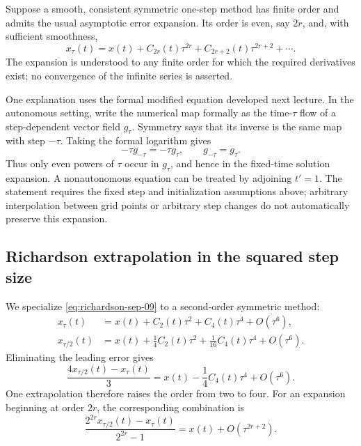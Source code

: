 \begin{theorem}
 Suppose a smooth, consistent symmetric one-step method has finite
 order and admits the usual asymptotic error expansion. Its order
 is even, say \(2r\), and, with sufficient smoothness,
 \begin{equation}\label{eq:even-error-sep-30}
  x_\tau(t)=x(t)+C_{2r}(t)\tau^{2r}
       +C_{2r+2}(t)\tau^{2r+2}+\cdots.
 \end{equation}
 The expansion is understood to any finite order for which the
 required derivatives exist; no convergence of the infinite series
 is asserted.
\end{theorem}

One explanation uses the formal modified equation developed next
lecture. In the autonomous setting, write the numerical map formally
as the time-\(\tau\) flow of a step-dependent vector field
\(g_\tau\). Symmetry says that its inverse is the same map with
step \(-\tau\). Taking the formal logarithm gives
\[
 -\tau g_{-\tau}=-\tau g_\tau,
 \qquad g_{-\tau}=g_\tau.
\]
Thus only even powers of \(\tau\) occur in \(g_\tau\), and hence
in the fixed-time solution expansion. A nonautonomous equation can
be treated by adjoining \(t'=1\). The statement requires the fixed
step and initialization assumptions above; arbitrary interpolation
between grid points or arbitrary step changes do not automatically
preserve this expansion.

\subsection{Richardson extrapolation in the squared step size}

We specialize \eqref{eq:richardson-sep-09} to a second-order
symmetric method:
\begin{align*}
 x_\tau(t)&=x(t)+C_2(t)\tau^2+C_4(t)\tau^4+O(\tau^6),\\
 x_{\tau/2}(t)&=x(t)+\frac14C_2(t)\tau^2
                          +\frac1{16}C_4(t)\tau^4+O(\tau^6).
\end{align*}
Eliminating the leading error gives
\begin{equation}\label{eq:richardson-four-sep-30}
 \boxed{\frac{4x_{\tau/2}(t)-x_\tau(t)}3
        =x(t)-\frac14C_4(t)\tau^4+O(\tau^6).}
\end{equation}
One extrapolation therefore raises the order from two to four.
For an expansion beginning at order \(2r\), the corresponding
combination is
\[
 \frac{2^{2r}x_{\tau/2}(t)-x_\tau(t)}{2^{2r}-1}
       =x(t)+O(\tau^{2r+2}).
\]

